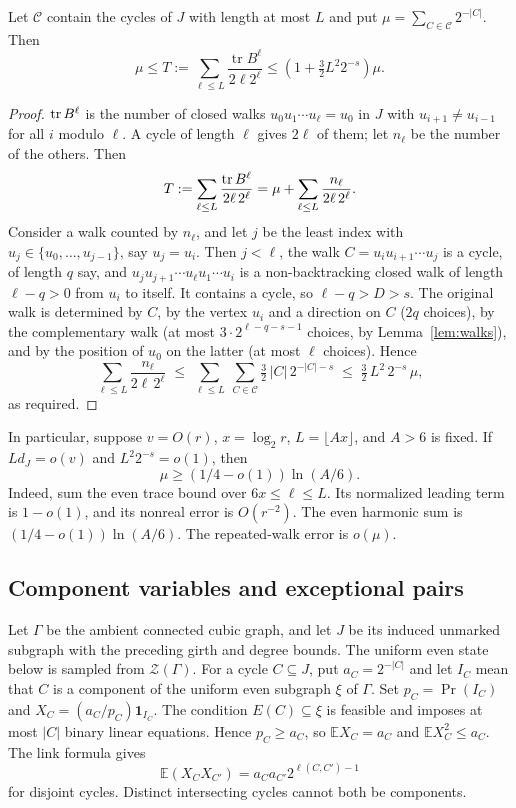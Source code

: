 \begin{lemma}\label{lem:polynomial-repeated-walks}
Let $\mathcal C$ contain the cycles of $J$ with length at most $L$ and put $\mu=\sum_{C\in\mathcal C}2^{-|C|}$.
Then
\[
 \mu\le T:=\sum_{\ell\le L}\frac{\operatorname{tr}B^\ell}{2\ell2^\ell}
 \le\left(1+\tfrac32L^2 2^{-s}\right)\mu.
\]
\end{lemma}
\begin{proof}
$\operatorname{tr} B^{\ell}$ is the number of closed walks $u_0u_1\cdots u_\ell=u_0$ in $J$ with
$u_{i+1}\ne u_{i-1}$ for all $i$ modulo $\ell$. A cycle of length $\ell$ gives $2\ell$ of them; let
$n_\ell$ be the number of the others. Then
\[
  T:=\sum_{\ell\le L}\frac{\operatorname{tr} B^{\ell}}{2\ell\,2^{\ell}}=\mu+\sum_{\ell\le L}\frac{n_\ell}{2\ell\,2^{\ell}} .
\]
Consider a walk counted by $n_\ell$, and let $j$ be the least index with
$u_j\in\{u_0,\dots,u_{j-1}\}$, say $u_j=u_i$. Then $j<\ell$, the walk $C=u_iu_{i+1}\cdots u_j$ is a
cycle, of length $q$ say, and $u_ju_{j+1}\cdots u_\ell u_1\cdots u_i$ is a non-backtracking closed
walk of length $\ell-q>0$ from $u_i$ to itself. It contains a cycle, so $\ell-q>D>s$. The original
walk is determined by $C$, by the vertex $u_i$ and a direction on $C$ ($2q$ choices), by the
complementary walk (at most $3\cdot2^{\ell-q-s-1}$ choices, by Lemma~\ref{lem:walks}), and by the
position of $u_0$ on the latter (at most $\ell$ choices). Hence
\[
  \sum_{\ell\le L}\frac{n_\ell}{2\ell\,2^{\ell}}
  \;\le\;\sum_{\ell\le L}\ \sum_{C\in\mathcal{C}}\tfrac32\,|C|\,2^{-|C|-s}
  \;\le\;\tfrac32\,L^{2}\,2^{-s}\,\mu,
\]
as required.


\end{proof}

In particular, suppose $v=O(r)$, $x=\log_2r$, $L=\lfloor Ax\rfloor$, and $A>6$ is fixed.
If $Ld_J=o(v)$ and $L^2 2^{-s}=o(1)$, then
\[
 \mu\ge(1/4-o(1))\ln(A/6).
\]
Indeed, sum the even trace bound over $6x\le\ell\le L$.
Its normalized leading term is $1-o(1)$, and its nonreal error is $O(r^{-2})$.
The even harmonic sum is $(1/4-o(1))\ln(A/6)$.
The repeated-walk error is $o(\mu)$.

\subsection{Component variables and exceptional pairs}
Let $\Gamma$ be the ambient connected cubic graph, and let $J$ be its induced unmarked subgraph with the preceding girth and degree bounds.
The uniform even state below is sampled from $\mathcal Z(\Gamma)$.
For a cycle $C\subseteq J$, put $a_C=2^{-|C|}$ and let $I_C$ mean that $C$ is a component of the uniform even subgraph $\xi$ of $\Gamma$.
Set $p_C=\Pr(I_C)$ and $X_C=(a_C/p_C)\mathbf1_{I_C}$.
The condition $E(C)\subseteq\xi$ is feasible and imposes at most $|C|$ binary linear equations.
Hence $p_C\ge a_C$, so $\mathbb EX_C=a_C$ and $\mathbb EX_C^2\le a_C$.
The link formula gives
\[
 \mathbb E(X_CX_{C'})=a_Ca_{C'}2^{\ell(C,C')-1}
\]
for disjoint cycles.
Distinct intersecting cycles cannot both be components.

